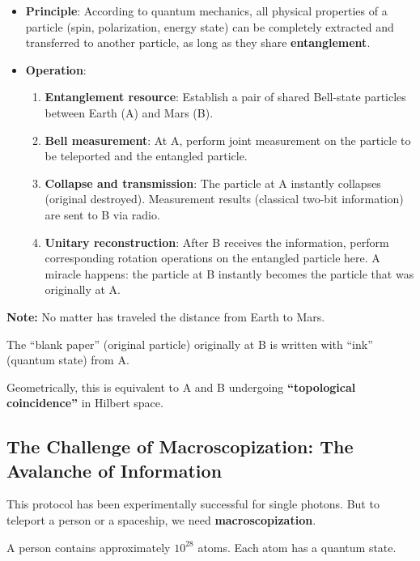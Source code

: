 \begin{itemize}
\item \textbf{Principle}: According to quantum mechanics, all physical properties of a particle (spin, polarization, energy state) can be completely extracted and transferred to another particle, as long as they share \textbf{entanglement}.

\item \textbf{Operation}:

    \begin{enumerate}
    \item \textbf{Entanglement resource}: Establish a pair of shared Bell-state particles between Earth (A) and Mars (B).

    \item \textbf{Bell measurement}: At A, perform joint measurement on the particle to be teleported and the entangled particle.

    \item \textbf{Collapse and transmission}: The particle at A instantly collapses (original destroyed). Measurement results (classical two-bit information) are sent to B via radio.

    \item \textbf{Unitary reconstruction}: After B receives the information, perform corresponding rotation operations on the entangled particle here. A miracle happens: the particle at B instantly becomes the particle that was originally at A.
    \end{enumerate}
\end{itemize}

\textbf{Note:} No matter has traveled the distance from Earth to Mars.

The ``blank paper'' (original particle) originally at B is written with ``ink'' (quantum state) from A.

Geometrically, this is equivalent to A and B undergoing \textbf{``topological coincidence''} in Hilbert space.

\subsection{The Challenge of Macroscopization: The Avalanche of Information}

This protocol has been experimentally successful for single photons. But to teleport a person or a spaceship, we need \textbf{macroscopization}.

A person contains approximately $10^{28}$ atoms. Each atom has a quantum state.

